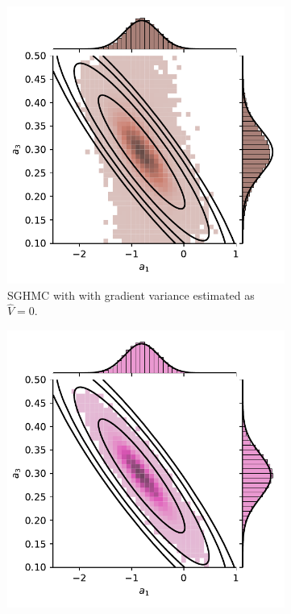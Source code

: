\begin{figure}[htbp]
    \centering
    \begin{subfigure}[t]{0.45\linewidth}
        \centering
        \includegraphics[width=\linewidth]{Figures/simulated_joint_SGHMC_5.pdf} 
        \caption{SGHMC with with gradient variance estimated as $\hat{V}=0$.}
    \end{subfigure}
    \begin{subfigure}[t]{0.45\linewidth}
        \centering
        \includegraphics[width=\linewidth]{Figures/simulated_var_est_joint_ExpWeightedEstimator.pdf} 

\end{subfigure}
\end{figure}
